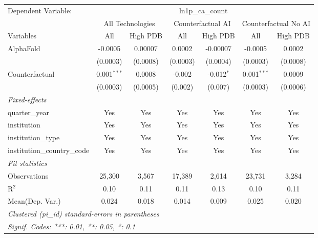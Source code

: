 \begingroup
\centering
\begin{tabular}{lcccccc}
   \tabularnewline \midrule \midrule
   Dependent Variable: & \multicolumn{6}{c}{ln1p\_ca\_count}\\
 & \multicolumn{2}{c}{All Technologies} & \multicolumn{2}{c}{Counterfactual AI} & \multicolumn{2}{c}{Counterfactual No AI} \\
\cmidrule(lr){1-1}\cmidrule(lr){2-3} \cmidrule(lr){4-5} \cmidrule(lr){6-7}
Variables & \multicolumn{1}{c}{All} & \multicolumn{1}{c}{High PDB} & \multicolumn{1}{c}{All} & \multicolumn{1}{c}{High PDB} & \multicolumn{1}{c}{All} & \multicolumn{1}{c}{High PDB} \\
\cmidrule(lr){1-1}\cmidrule(lr){2-2} \cmidrule(lr){3-3} \cmidrule(lr){4-4} \cmidrule(lr){5-5} \cmidrule(lr){6-6} \cmidrule(lr){7-7}
   AlphaFold                    & -0.0005       & 0.00007  & 0.0002   & -0.00007     & -0.0005       & 0.0002\\   
                                & (0.0003)      & (0.0008) & (0.0003) & (0.0004)     & (0.0003)      & (0.0008)\\   
   Counterfactual               & 0.001$^{***}$ & 0.0008   & -0.002   & -0.012$^{*}$ & 0.001$^{***}$ & 0.0009\\   
                                & (0.0003)      & (0.0005) & (0.002)  & (0.007)      & (0.0003)      & (0.0006)\\   
   \midrule
   \emph{Fixed-effects}\\
   quarter\_year                & Yes           & Yes      & Yes      & Yes          & Yes           & Yes\\  
   institution                  & Yes           & Yes      & Yes      & Yes          & Yes           & Yes\\  
   institution\_type            & Yes           & Yes      & Yes      & Yes          & Yes           & Yes\\  
   institution\_country\_code   & Yes           & Yes      & Yes      & Yes          & Yes           & Yes\\  
   \midrule
   \emph{Fit statistics}\\
   Observations                 & 25,300        & 3,567    & 17,389   & 2,614        & 23,731        & 3,284\\  
   R$^2$                        & 0.10          & 0.11     & 0.11     & 0.13         & 0.10          & 0.11\\  
Mean(Dep. Var.) & 0.024 & 0.018 & 0.014 & 0.009 & 0.025 & 0.020 \\
   \midrule \midrule
   \multicolumn{7}{l}{\emph{Clustered (pi\_id) standard-errors in parentheses}}\\
   \multicolumn{7}{l}{\emph{Signif. Codes: ***: 0.01, **: 0.05, *: 0.1}}\\
\end{tabular}
\par\endgroup
